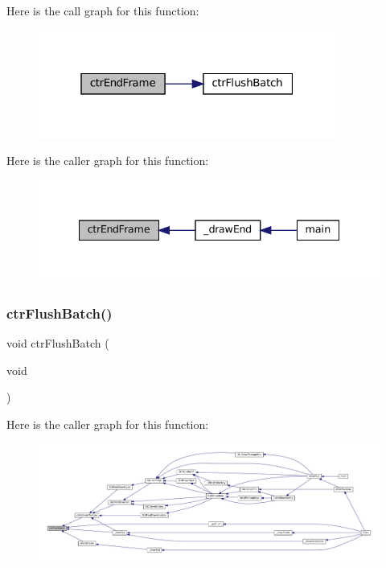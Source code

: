 Here is the call graph for this function\+:
\nopagebreak
\begin{figure}[H]
\begin{center}
\leavevmode
\includegraphics[width=277pt]{ctr-gpu_8c_afde5ab22c1fe022b58bee18e06dfa89e_cgraph}
\end{center}
\end{figure}
Here is the caller graph for this function\+:
\nopagebreak
\begin{figure}[H]
\begin{center}
\leavevmode
\includegraphics[width=335pt]{ctr-gpu_8c_afde5ab22c1fe022b58bee18e06dfa89e_icgraph}
\end{center}
\end{figure}
\mbox{\label{ctr-gpu_8c_a7ab09886a00743bfac1d2b4aee447a34}} 
\subsubsection{\texorpdfstring{ctr\+Flush\+Batch()}{ctrFlushBatch()}}
{\footnotesize\ttfamily void ctr\+Flush\+Batch (\begin{DoxyParamCaption}\item[{void}]{ }\end{DoxyParamCaption})}

Here is the caller graph for this function\+:
\nopagebreak
\begin{figure}[H]
\begin{center}
\leavevmode
\includegraphics[width=350pt]{ctr-gpu_8c_a7ab09886a00743bfac1d2b4aee447a34_icgraph}
\end{center}
\end{figure}
\mbox{\label{ctr-gpu_8c_a04a94149209a778c397be256b872da4a}} 

